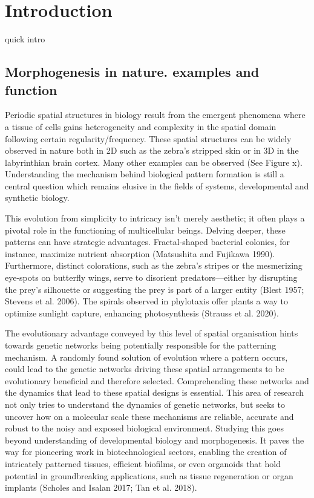 
\chapter{Introduction}

quick intro
\section{Morphogenesis in nature. examples and function}
Periodic spatial structures in biology result from the emergent phenomena where a tissue of cells gains heterogeneity and complexity in the spatial domain following certain regularity/frequency.
These spatial structures can be widely observed in nature both in 2D such as the zebra's stripped skin or in 3D in the labyrinthian brain cortex.
Many other examples can be observed (See Figure x).
Understanding the mechanism behind biological pattern formation is still a central question which remains elusive in the fields of systems, developmental and synthetic biology.

This evolution from simplicity to intricacy isn't merely aesthetic; it often plays a pivotal role in the functioning of multicellular beings.
Delving deeper, these patterns can have strategic advantages. Fractal-shaped bacterial colonies, for instance, maximize nutrient absorption (Matsushita and Fujikawa 1990).
Furthermore, distinct colorations, such as the zebra's stripes or the mesmerizing eye-spots on butterfly wings, serve to disorient predators—either by disrupting the prey's silhouette or suggesting the prey is part of a larger entity (Blest 1957; Stevens et al. 2006).
The spirals observed in phylotaxis offer plants a way to optimize sunlight capture, enhancing photosynthesis (Strauss et al. 2020).

The evolutionary advantage conveyed by this level of spatial organisation  hints towards genetic networks being potentially responsible for the patterning mechanism.
A randomly found solution of evolution where a pattern occurs, could lead to the genetic networks driving these spatial arrangements to be evolutionary beneficial and therefore selected.
Comprehending these networks and the dynamics that lead to these spatial designs is essential.
This area of research not only tries to understand the dynamics of genetic networks, but seeks to uncover how on a molecular scale these mechanisms are reliable, accurate and robust to the noisy and exposed biological environment.
Studying this goes beyond understanding of developmental biology and morphogenesis.
It paves the way for pioneering work in biotechnological sectors, enabling the creation of intricately patterned tissues, efficient biofilms, or even organoids that hold potential in groundbreaking applications, such as tissue regeneration or organ implants (Scholes and Isalan 2017; Tan et al. 2018).



